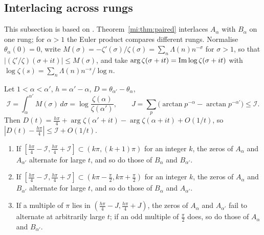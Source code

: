 \subsection{Interlacing across rungs}\label{mi:sec:interlace}

This subsection is based on \cite{P26pg10}. Theorem~\ref{mi:thm:paired} interlaces $A_\alpha$ with $B_\alpha$ on one rung; for $\alpha>1$ the Euler product compares different rungs. Normalise $\theta_\alpha(0)=0$, write $M(\sigma)=-\zeta'(\sigma)/\zeta(\sigma)=\sum_n\Lambda(n)n^{-\sigma}$ for $\sigma>1$, so that $|(\zeta'/\zeta)(\sigma+it)|\le M(\sigma)$, and take $\arg\zeta(\sigma+it)=\operatorname{Im}\log\zeta(\sigma+it)$ with $\log\zeta(s)=\sum_n\Lambda(n)n^{-s}/\log n$.

\begin{proposition}\label{mi:prop:pairs}
Let $1<\alpha<\alpha'$, $h=\alpha'-\alpha$, $D=\theta_{\alpha'}-\theta_\alpha$,
\[
\mathcal I=\int_\alpha^{\alpha'}M(\sigma)\,d\sigma=\log\frac{\zeta(\alpha)}{\zeta(\alpha')},\qquad J=\sum_p\big(\arctan p^{-\alpha}-\arctan p^{-\alpha'}\big)\le\mathcal I .
\]
Then $D(t)=\frac{h\pi}4+\arg\zeta(\alpha'+it)-\arg\zeta(\alpha+it)+O(1/t)$, so $|D(t)-\frac{h\pi}4|\le\mathcal I+O(1/t)$.
\begin{enumerate}
\item[(i)] If $[\frac{h\pi}4-\mathcal I,\frac{h\pi}4+\mathcal I]\subset(k\pi,(k+1)\pi)$ for an integer $k$, the zeros of $A_\alpha$ and $A_{\alpha'}$ alternate for large $t$, and so do those of $B_\alpha$ and $B_{\alpha'}$.
\item[(ii)] If $[\frac{h\pi}4-\mathcal I,\frac{h\pi}4+\mathcal I]\subset(k\pi-\frac\pi2,k\pi+\frac\pi2)$ for an integer $k$, the zeros of $A_\alpha$ and $B_{\alpha'}$ alternate for large $t$, and so do those of $B_\alpha$ and $A_{\alpha'}$.
\item[(iii)] If a multiple of $\pi$ lies in $(\frac{h\pi}4-J,\frac{h\pi}4+J)$, the zeros of $A_\alpha$ and $A_{\alpha'}$ fail to alternate at arbitrarily large $t$; if an odd multiple of $\frac\pi2$ does, so do those of $A_\alpha$ and $B_{\alpha'}$.
\end{enumerate}
\end{proposition}

